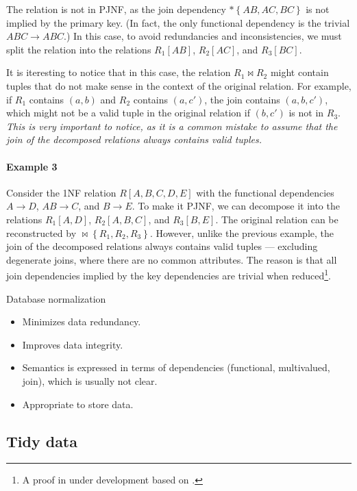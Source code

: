 The relation is not in PJNF, as the join dependency $* \left\{ AB, AC, BC \right\}$ is not
implied by the primary key.  (In fact, the only functional dependency is the trivial $ABC
\to ABC$.)  In this case, to avoid redundancies and inconsistencies, we must split the
relation into the relations $R_1[AB]$, $R_2[AC]$, and $R_3[BC]$.

It is iteresting to notice that in this case, the relation $R_1 \bowtie R_2$ might
contain tuples that do not make sense in the context of the original relation.  For
example, if $R_1$ contains $(a, b)$ and $R_2$ contains $(a, c')$, the join contains
$(a, b, c')$, which might not be a valid tuple in the original relation if $(b, c')$ is
not in $R_3$.  \emph{This is very important to notice, as it is a common mistake to assume
that the join of the decomposed relations always contains valid tuples.}

\paragraph{Example 3}  Consider the 1NF relation $R[A, B, C, D, E]$ with the functional
dependencies $A \to D$, $AB \to C$, and $B \to E$.  To make it PJNF, we can decompose it
into the relations $R_1[A, D]$, $R_2[A, B, C]$, and $R_3[B, E]$.  The original relation can
be reconstructed by $\bowtie \left\{ R_1, R_2, R_3 \right\}$.  However, unlike the
previous example, the join of the decomposed relations always contains valid tuples
--- excluding degenerate joins, where there are no common attributes.
The reason is that all join dependencies implied by the key dependencies are trivial when
reduced\footnote{\color{red}A proof in under development based on .}.

\begin{slidebox}{Database normalization}{}
  \begin{itemize}
    \item Minimizes data redundancy.
    \item Improves data integrity.
    \item Semantics is expressed in terms of dependencies (functional, multivalued, join),
      which is usually not clear.
    \item Appropriate to store data.
  \end{itemize}
\end{slidebox}

\subsection{Tidy data}

